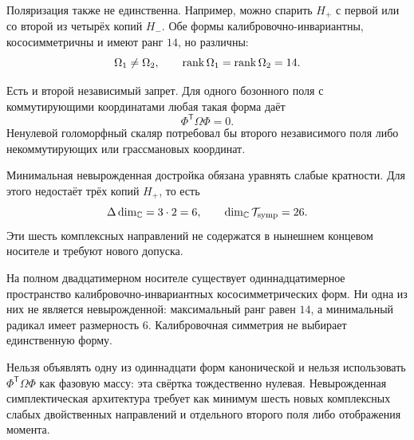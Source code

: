 Поляризация также не единственна. Например, можно спарить $H_+$ с первой
или со второй из четырёх копий $H_-$. Обе формы калибровочно-инвариантны,
кососимметричны и имеют ранг $14$, но различны:
\begin{equation}
 \Omega_1\neq\Omega_2,
 \qquad
 \operatorname{rank}\Omega_1=\operatorname{rank}\Omega_2=14.
 \label{eq:v8-symplectic-two-polarizations}
\end{equation}

Есть и второй независимый запрет. Для одного бозонного поля с коммутирующими
координатами любая такая форма даёт
\begin{equation}
 \Phi^{\mathsf T}\Omega\Phi=0.
 \label{eq:v8-symplectic-bosonic-self-contraction}
\end{equation}
Ненулевой голоморфный скаляр потребовал бы второго независимого поля либо
некоммутирующих или грассмановых координат.

Минимальная невырожденная достройка обязана уравнять слабые кратности. Для
этого недостаёт трёх копий $H_+$, то есть
\begin{equation}
 \Delta\dim_{\mathbb C}=3\cdot2=6,
 \qquad
 \dim_{\mathbb C}\mathcal T_{\rm symp}=26.
 \label{eq:v8-symplectic-minimal-completion}
\end{equation}
Эти шесть комплексных направлений не содержатся в нынешнем концевом
носителе и требуют нового допуска.

\begin{theorem}
На полном двадцатимерном носителе существует одиннадцатимерное пространство
калибровочно-инвариантных кососимметрических форм. Ни одна из них не является
невырожденной: максимальный ранг равен $14$, а минимальный радикал имеет
размерность $6$. Калибровочная симметрия не выбирает единственную форму.
\end{theorem}

\begin{nogocriterion}
Нельзя объявлять одну из одиннадцати форм канонической и нельзя использовать
$\Phi^{\mathsf T}\Omega\Phi$ как фазовую массу: эта свёртка тождественно
нулевая. Невырожденная симплектическая архитектура требует как минимум шесть
новых комплексных слабых двойственных направлений и отдельного второго
поля либо отображения момента.
\end{nogocriterion}


